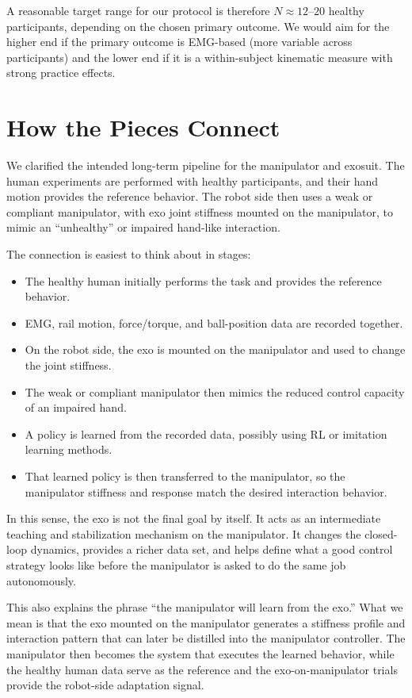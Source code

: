 \documentclass[11pt, a4paper]{article}
\begin{document}
A reasonable target range for our protocol is therefore $N \approx 12$--$20$ healthy participants, depending on the chosen primary outcome. We would aim for the higher end if the primary outcome is EMG-based (more variable across participants) and the lower end if it is a within-subject kinematic measure with strong practice effects.

\section{How the Pieces Connect}

We clarified the intended long-term pipeline for the manipulator and exosuit. The human experiments are performed with healthy participants, and their hand motion provides the reference behavior. The robot side then uses a weak or compliant manipulator, with exo joint stiffness mounted on the manipulator, to mimic an ``unhealthy'' or impaired hand-like interaction.

The connection is easiest to think about in stages:

\begin{itemize}[nosep]
  \item The healthy human initially performs the task and provides the reference behavior.
  \item EMG, rail motion, force/torque, and ball-position data are recorded together.
  \item On the robot side, the exo is mounted on the manipulator and used to change the joint stiffness.
  \item The weak or compliant manipulator then mimics the reduced control capacity of an impaired hand.
  \item A policy is learned from the recorded data, possibly using RL or imitation learning methods.
  \item That learned policy is then transferred to the manipulator, so the manipulator stiffness and response match the desired interaction behavior.
\end{itemize}

In this sense, the exo is not the final goal by itself. It acts as an intermediate teaching and stabilization mechanism on the manipulator. It changes the closed-loop dynamics, provides a richer data set, and helps define what a good control strategy looks like before the manipulator is asked to do the same job autonomously.

This also explains the phrase ``the manipulator will learn from the exo.'' What we mean is that the exo mounted on the manipulator generates a stiffness profile and interaction pattern that can later be distilled into the manipulator controller. The manipulator then becomes the system that executes the learned behavior, while the healthy human data serve as the reference and the exo-on-manipulator trials provide the robot-side adaptation signal.
\end{document}
